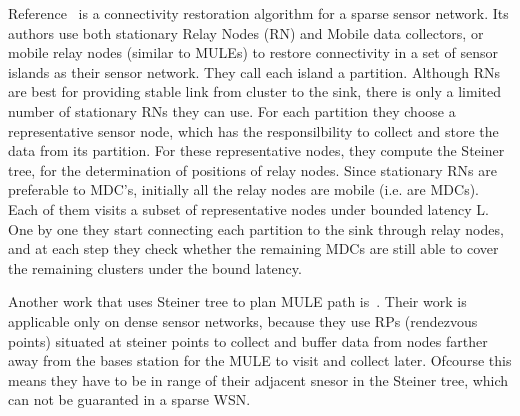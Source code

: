 Reference~\cite{sim3} is a connectivity restoration algorithm for a sparse sensor network. Its authors use both stationary Relay Nodes (RN) and Mobile data collectors, or mobile relay nodes (similar to MULEs) to restore connectivity in a set of sensor islands as their sensor network. They call each island a partition. Although RNs are best for providing stable link from cluster to the sink, there is only a limited number of stationary RNs they can use. For each partition they choose a representative sensor node, which has the responsilbility to collect and store the data from its partition. For these representative nodes, they compute the Steiner tree, for the determination of positions of relay nodes. Since stationary RNs are preferable to MDC's, initially all the relay nodes are mobile (i.e. are MDCs). Each of them visits a subset of representative nodes under bounded latency L. One by one they start connecting each partition to the sink through relay nodes, and at each step they check whether the remaining MDCs are still able to cover the remaining clusters under the bound latency.

Another work that uses Steiner tree to plan MULE path is~\cite{rendezvous}. Their work is applicable only on dense sensor networks, because they use RPs (rendezvous points) situated at steiner points to collect and buffer data from nodes farther away from the bases station for the MULE to visit and collect later. Ofcourse this means they have to be in range of their adjacent snesor in the Steiner tree, which can not be guaranted in a sparse WSN.
